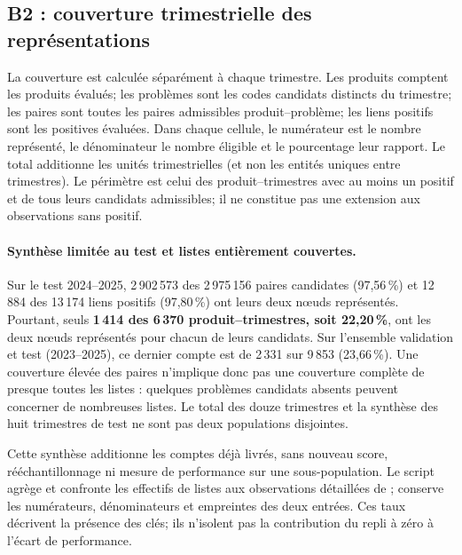 \subsection{B2 : couverture trimestrielle des représentations}
La couverture est calculée séparément à chaque trimestre. Les produits comptent les produits évalués; les problèmes sont les codes candidats distincts du trimestre; les paires sont toutes les paires admissibles produit--problème; les liens positifs sont les positives évaluées. Dans chaque cellule, le numérateur est le nombre représenté, le dénominateur le nombre éligible et le pourcentage leur rapport. Le total additionne les unités trimestrielles (et non les entités uniques entre trimestres). Le périmètre est celui des produit--trimestres avec au moins un positif et de tous leurs candidats admissibles; il ne constitue pas une extension aux observations sans positif.

\begin{table}[!htbp]\centering\scriptsize\setlength{\tabcolsep}{2pt}
\caption{B2, couverture par trimestre : représentés / éligibles (couverture en pourcentage). Le total couvre 2023--2025; la dernière ligne ne couvre que le test 2024--2025. Comptes issus de .}
\label{tab:maude-B2-coverage}

\end{table}

\FloatBarrier
\par{}
\paragraph{Synthèse limitée au test et listes entièrement couvertes.}
Sur le test 2024--2025, 2\,902\,573 des 2\,975\,156 paires candidates (97,56\,\%) et 12\,884 des 13\,174 liens positifs (97,80\,\%) ont leurs deux nœuds représentés. Pourtant, seuls \textbf{1\,414 des 6\,370 produit--trimestres, soit 22,20\,\%}, ont les deux nœuds représentés pour chacun de leurs candidats. Sur l'ensemble validation et test (2023--2025), ce dernier compte est de 2\,331 sur 9\,853 (23,66\,\%). Une couverture élevée des paires n'implique donc pas une couverture complète de presque toutes les listes : quelques problèmes candidats absents peuvent concerner de nombreuses listes. Le total des douze trimestres et la synthèse des huit trimestres de test ne sont pas deux populations disjointes.

Cette synthèse additionne les comptes déjà livrés, sans nouveau score, rééchantillonnage ni mesure de performance sur une sous-population. Le script  agrège  et confronte les effectifs de listes aux observations détaillées de ;  conserve les numérateurs, dénominateurs et empreintes des deux entrées. Ces taux décrivent la présence des clés; ils n'isolent pas la contribution du repli à zéro à l'écart de performance.

